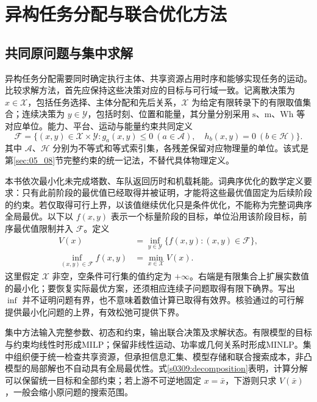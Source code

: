 \section{异构任务分配与联合优化方法}
\label{sec:03_09}

\subsection{共同原问题与集中求解}

异构任务分配需要同时确定执行主体、共享资源占用时序和能够实现任务的运动。比较求解方法，首先应保持这些决策对应的目标与可行域一致。记离散决策为 $x\in\mathcal X$，包括任务选择、主体分配和先后关系，$\mathcal X$ 为给定有限转录下的有限取值集合；连续决策为 $y\in\mathcal Y$，包括时刻、位置和能量，其分量分别采用 $\mathrm{s}$、$\mathrm{m}$、$\mathrm{Wh}$ 等对应单位。能力、平台、运动与能量约束共同定义
\begin{equation}
\label{s0309:shared_domain}
\mathcal F=\{(x,y)\in\mathcal X\times\mathcal Y:
 g_a(x,y)\leq0\ (a\in\mathcal A),\quad
 h_b(x,y)=0\ (b\in\mathcal H)\}.
\end{equation}
其中 $\mathcal A$、$\mathcal H$ 分别为不等式和等式索引集，各残差保留对应物理量的单位。该式是第\ref{sec:05_08}节完整约束的统一记法，不替代具体物理定义。

本书依次最小化未完成塔数、车队返回历时和机载耗能。词典序优化的数学定义要求：只有此前阶段的最优值已经取得并被证明，才能将这些最优值固定为后续阶段的约束。若仅取得可行上界，以该值继续优化只是条件优化，不能称为完整词典序全局最优。以下以 $f(x,y)$ 表示一个标量阶段的目标，单位沿用该阶段目标，前序最优值限制并入 $\mathcal F$。定义
\begin{align}
\label{s0309:value_function}
V(x)&=\inf_{y\in\mathcal Y}\{f(x,y):(x,y)\in\mathcal F\},\\
\label{s0309:decomposition}
\inf_{(x,y)\in\mathcal F}f(x,y)&=\min_{x\in\mathcal X}V(x).
\end{align}
这里假定 $\mathcal X$ 非空，空条件可行集的值约定为 $+\infty$。右端是有限集合上扩展实数值的最小化；要恢复实际最优方案，还须相应连续子问题取得有限下确界。写出 $\inf$ 并不证明问题有界，也不意味着数值计算已取得有效界。核验通过的可行解提供最小化问题的上界，有效松弛可提供下界。

集中方法输入完整参数、初态和约束，输出联合决策及求解状态。有限模型的目标与约束均线性时形成MILP；保留非线性运动、功率或几何关系时形成MINLP。集中组织便于统一检查共享资源，但承担信息汇集、模型存储和联合搜索成本，非凸模型的局部解也不自动具有全局最优性。式\eqref{s0309:decomposition}表明，计算分解可以保留统一目标和全部约束；若上游不可逆地固定 $x=\bar x$，下游则只求 $V(\bar x)$，一般会缩小原问题的搜索范围。

